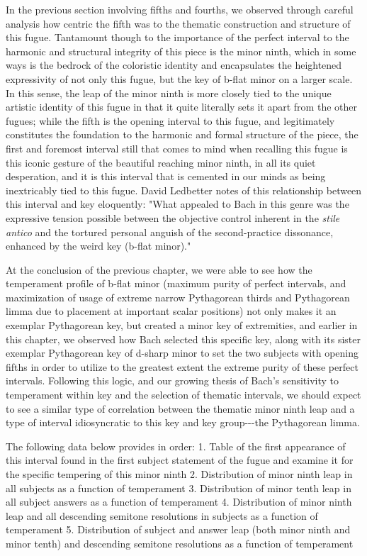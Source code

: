    In the previous section involving fifths and fourths, we observed
through careful analysis how centric the fifth was to the thematic
construction and structure of this fugue. Tantamount though to the
importance of the perfect interval to the harmonic and structural
integrity of this piece is the minor ninth, which in some ways is the
bedrock of the coloristic identity and encapsulates the heightened
expressivity of not only this fugue, but the key of b-flat minor on a
larger scale. In this sense, the leap of the minor ninth is more closely
tied to the unique artistic identity of this fugue in that it quite
literally sets it apart from the other fugues; while the fifth is the
opening interval to this fugue, and legitimately constitutes the
foundation to the harmonic and formal structure of the piece, the first
and foremost interval still that comes to mind when recalling this fugue
is this iconic gesture of the beautiful reaching minor ninth, in all its
quiet desperation, and it is this interval that is cemented in our minds
as being inextricably tied to this fugue. David Ledbetter notes of this
relationship between this interval and key eloquently: "What appealed to
Bach in this genre was the expressive tension possible between the
objective control inherent in the \emph{stile antico} and the tortured
personal anguish of the second-practice dissonance, enhanced by the
weird key (b-flat minor)."

At the conclusion of the previous chapter, we were able to see how the
temperament profile of b-flat minor (maximum purity of perfect
intervals, and maximization of usage of extreme narrow Pythagorean
thirds and Pythagorean limma due to placement at important scalar
positions) not only makes it an exemplar Pythagorean key, but created a
minor key of extremities, and earlier in this chapter, we observed how
Bach selected this specific key, along with its sister exemplar
Pythagorean key of d-sharp minor to set the two subjects with opening
fifths in order to utilize to the greatest extent the extreme purity of
these perfect intervals. Following this logic, and our growing thesis of
Bach's sensitivity to temperament within key and the selection of
thematic intervals, we should expect to see a similar type of
correlation between the thematic minor ninth leap and a type of interval
idiosyncratic to this key and key group-\/-\/-the Pythagorean limma.

The following data below provides in order: 1. Table of the first
appearance of this interval found in the first subject statement of the
fugue and examine it for the specific tempering of this minor ninth 2.
Distribution of minor ninth leap in all subjects as a function of
temperament 3. Distribution of minor tenth leap in all subject answers
as a function of temperament 4. Distribution of minor ninth leap and all
descending semitone resolutions in subjects as a function of temperament
5. Distribution of subject and answer leap (both minor ninth and minor
tenth) and descending semitone resolutions as a function of temperament

